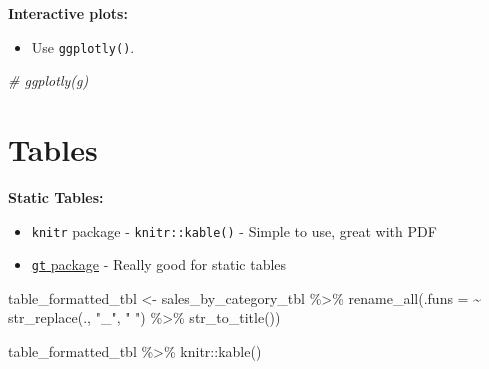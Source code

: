 \documentclass[
]{article}
\newenvironment{Shaded}{\begin{snugshade}}{\end{snugshade}}
\newcommand{\AttributeTok}[1]{\textcolor[rgb]{0.77,0.63,0.00}{#1}}
\newcommand{\CommentTok}[1]{\textcolor[rgb]{0.56,0.35,0.01}{\textit{#1}}}
\newcommand{\FunctionTok}[1]{\textcolor[rgb]{0.00,0.00,0.00}{#1}}
\newcommand{\NormalTok}[1]{#1}
\newcommand{\OtherTok}[1]{\textcolor[rgb]{0.56,0.35,0.01}{#1}}
\newcommand{\SpecialCharTok}[1]{\textcolor[rgb]{0.00,0.00,0.00}{#1}}
\newcommand{\StringTok}[1]{\textcolor[rgb]{0.31,0.60,0.02}{#1}}
\providecommand{\tightlist}{%
  \setlength{\itemsep}{0pt}\setlength{\parskip}{0pt}}
\begin{document}
\textbf{Interactive plots:}

\begin{itemize}
\tightlist
\item
  Use \texttt{ggplotly()}.
\end{itemize}

\begin{Shaded}
\begin{Highlighting}[]
\CommentTok{\# ggplotly(g)}
\end{Highlighting}
\end{Shaded}

\hypertarget{tables}{%
\section{Tables}\label{tables}}

\textbf{Static Tables:}

\begin{itemize}
\tightlist
\item
  \texttt{knitr} package - \texttt{knitr::kable()} - Simple to use,
  great with PDF
\item
  \href{https://gt.rstudio.com/}{\texttt{gt} package} - Really good for
  static tables
\end{itemize}

\begin{Shaded}
\begin{Highlighting}[]
\NormalTok{table\_formatted\_tbl }\OtherTok{\textless{}{-}}\NormalTok{ sales\_by\_category\_tbl }\SpecialCharTok{\%\textgreater{}\%}
  \FunctionTok{rename\_all}\NormalTok{(}\AttributeTok{.funs =} \SpecialCharTok{\textasciitilde{}} \FunctionTok{str\_replace}\NormalTok{(., }\StringTok{"\_"}\NormalTok{, }\StringTok{" "}\NormalTok{) }\SpecialCharTok{\%\textgreater{}\%}
               \FunctionTok{str\_to\_title}\NormalTok{()) }

\NormalTok{table\_formatted\_tbl }\SpecialCharTok{\%\textgreater{}\%}\NormalTok{ knitr}\SpecialCharTok{::}\FunctionTok{kable}\NormalTok{()}
\end{Highlighting}
\end{Shaded}
\end{document}
